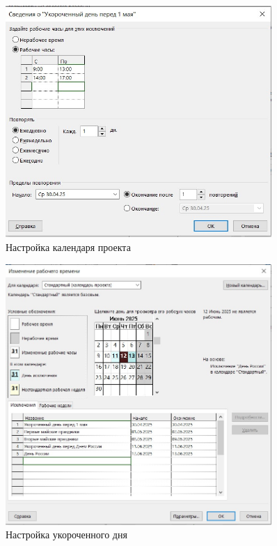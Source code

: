 \begin{figure}[H]
	\centering
	\includegraphics[width=0.9\textwidth]{img/task1/screen1_2.jpg}
	\caption{Настройка календаря проекта}
	\label{fig:calendar}
\end{figure}

\begin{figure}[H]
	\centering
	\includegraphics[width=0.9\textwidth]{img/task1/screen1_3.jpg}
	\caption{Настройка укороченного дня}
	\label{fig:day}
\end{figure}

